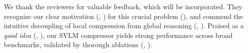 \noindent We thank the reviewers for valuable feedback, which will be incorporated.
%
They recognize our clear motivation (\Ra, \Rc) for this crucial problem (\Rb), and commend the intuitive decoupling of local compression from global reasoning (\Rb, \Rc).
%
Praised as a \emph{good idea} (\Ra, \Rc), our SVLM compressor yields strong performance across broad benchmarks, validated by thorough ablations (\Ra, \Rb).

